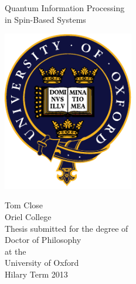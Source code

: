 \pagestyle{empty}
\vspace*{1cm}
\begin{center}
  
  {\Huge Quantum Information Processing}\\[0.5cm] 
  {\Huge in Spin-Based Systems}\\[2cm]

  \centerline{\includegraphics[height=7cm]{Figures/OULogo}}  \vspace{2cm}
  
  {\Large{Tom Close}}\\
  {\Large{Oriel College}}\\[1.5cm]
 
  Thesis submitted for the degree of \\
  Doctor of Philosophy\\
  at the\\
  University of Oxford\\
  Hilary Term 2013

\end{center}
